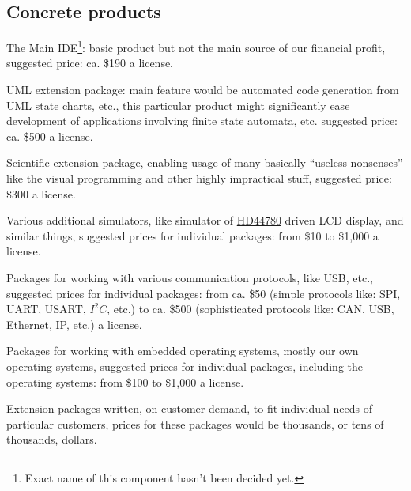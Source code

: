 \documentclass[a4paper,twoside,15pt]{book}
\begin{document}
		\subsection{Concrete products}
			\begin{dinglist}{73}
				\item The Main IDE\footnote{Exact name of this component hasn't been decided yet.}: basic product but not the main source of our financial profit, suggested price: ca. \$190 a license.
				\item UML extension package: main feature would be automated code generation from UML state charts, etc., this particular product might significantly ease development of applications involving finite state automata, etc. suggested price: ca. \$500 a license.
				\item Scientific extension package, enabling usage of many basically ``useless nonsenses'' like the visual programming and other highly impractical stuff, suggested price: \$300 a license.
				\item Various additional simulators, like simulator of \href{http://en.wikipedia.org/wiki/Hitachi_HD44780_LCD_controller}{HD44780} driven LCD display, and similar things, suggested prices for individual packages: from \$10 to \$1,000 a license.
				\item Packages for working with various communication protocols, like USB, etc., suggested prices for individual packages: from ca. \$50 (simple protocols like: SPI, UART, USART, $I^2C$, etc.) to ca. \$500 (sophisticated protocols like: CAN, USB, Ethernet, IP, etc.) a license.
				\item Packages for working with embedded operating systems, mostly our own operating systems, suggested prices for individual packages, including the operating systems: from \$100 to \$1,000 a license.
				\item Extension packages written, on customer demand, to fit individual needs of particular customers, prices for these packages would be thousands, or tens of thousands, dollars.
			\end{dinglist}
\end{document}
